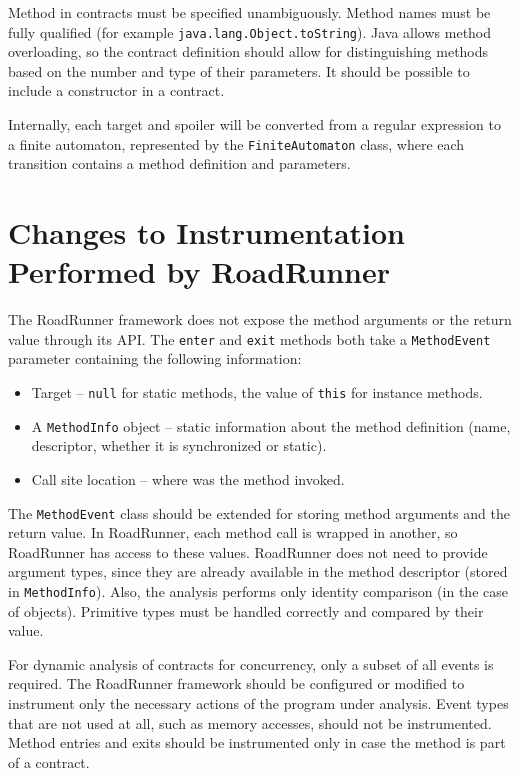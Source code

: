 Method in contracts must be specified unambiguously. Method names must be fully
qualified (for example \texttt{java.lang.Object.toString}). Java allows method
overloading, so the contract definition should allow for distinguishing methods
based on the number and type of their parameters. It should be possible to
include a constructor in a contract.


Internally, each target and spoiler will be converted from a regular expression
to a finite automaton, represented by the \texttt{FiniteAutomaton} class, where
each transition contains a method definition and parameters.

\section{Changes to Instrumentation Performed by RoadRunner}

The RoadRunner framework does not expose the method arguments or the return
value through its API. The \texttt{enter} and \texttt{exit} methods both take a
\texttt{MethodEvent} parameter containing the following information:
\begin{itemize}
    \item Target -- \texttt{null} for static methods, the value of \texttt{this}
        for instance methods.
    \item A \texttt{MethodInfo} object -- static information about the method
        definition (name, descriptor, whether it is synchronized or static).
    \item Call site location -- where was the method invoked.
\end{itemize}

The \texttt{MethodEvent} class should be extended for storing method arguments
and the return value. In RoadRunner, each method call is wrapped in another, so
RoadRunner has access to these values. RoadRunner does not need to provide
argument types, since they are already available in the method descriptor
(stored in \texttt{MethodInfo}). Also, the analysis performs only identity
comparison (in the case of objects). Primitive types must be handled correctly
and compared by their value.

For dynamic analysis of contracts for concurrency, only a subset of all events
is required. The RoadRunner framework should be configured or modified to
instrument only the necessary actions of the program under analysis. Event types
that are not used at all, such as memory accesses, should not be instrumented.
Method entries and exits should be instrumented only in case the method is part
of a contract.

